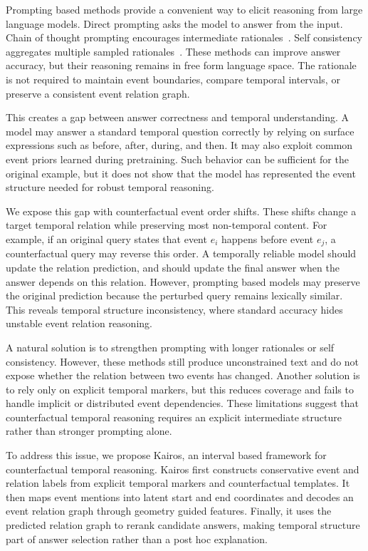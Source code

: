 \documentclass[11pt]{article}
\newcommand{\method}{Kairos}
\begin{document}
Prompting based methods provide a convenient way to elicit reasoning from large language models. Direct prompting asks the model to answer from the input. Chain of thought prompting encourages intermediate rationales~\citep{wei2022chain,kojima2022large}. Self consistency aggregates multiple sampled rationales~\citep{wang2023selfconsistency}. These methods can improve answer accuracy, but their reasoning remains in free form language space. The rationale is not required to maintain event boundaries, compare temporal intervals, or preserve a consistent event relation graph.

This creates a gap between answer correctness and temporal understanding. A model may answer a standard temporal question correctly by relying on surface expressions such as before, after, during, and then. It may also exploit common event priors learned during pretraining. Such behavior can be sufficient for the original example, but it does not show that the model has represented the event structure needed for robust temporal reasoning.

We expose this gap with counterfactual event order shifts. These shifts change a target temporal relation while preserving most non-temporal content. For example, if an original query states that event \(e_i\) happens before event \(e_j\), a counterfactual query may reverse this order. A temporally reliable model should update the relation prediction, and should update the final answer when the answer depends on this relation. However, prompting based models may preserve the original prediction because the perturbed query remains lexically similar. This reveals temporal structure inconsistency, where standard accuracy hides unstable event relation reasoning.

A natural solution is to strengthen prompting with longer rationales or self consistency. However, these methods still produce unconstrained text and do not expose whether the relation between two events has changed. Another solution is to rely only on explicit temporal markers, but this reduces coverage and fails to handle implicit or distributed event dependencies. These limitations suggest that counterfactual temporal reasoning requires an explicit intermediate structure rather than stronger prompting alone.

To address this issue, we propose \method, an interval based framework for counterfactual temporal reasoning. \method{} first constructs conservative event and relation labels from explicit temporal markers and counterfactual templates. It then maps event mentions into latent start and end coordinates and decodes an event relation graph through geometry guided features. Finally, it uses the predicted relation graph to rerank candidate answers, making temporal structure part of answer selection rather than a post hoc explanation.
\end{document}
